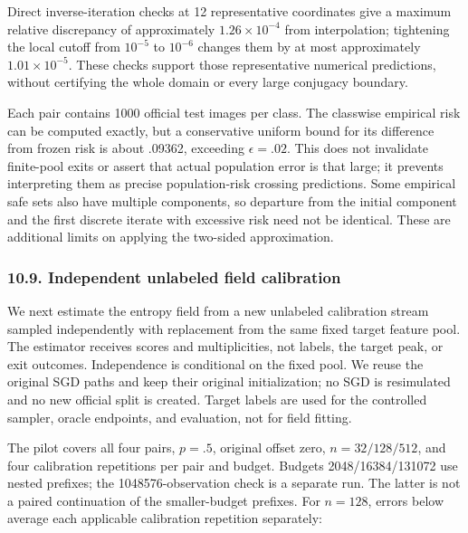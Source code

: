 Direct inverse-iteration checks at 12 representative coordinates give a
maximum relative discrepancy of approximately \(1.26\times10^{-4}\) from
interpolation; tightening the local cutoff from \(10^{-5}\) to
\(10^{-6}\) changes them by at most approximately \(1.01\times10^{-5}\).
These checks support those representative numerical predictions, without
certifying the whole domain or every large conjugacy boundary.

Each pair contains 1000 official test images per class. The classwise
empirical risk can be computed exactly, but a conservative uniform bound
for its difference from frozen risk is about .09362, exceeding
\(\epsilon=.02\). This does not invalidate finite-pool exits or assert
that actual population error is that large; it prevents interpreting
them as precise population-risk crossing predictions. Some empirical
safe sets also have multiple components, so departure from the initial
component and the first discrete iterate with excessive risk need not be
identical. These are additional limits on applying the two-sided
approximation.

\subsubsection{10.9. Independent unlabeled field
calibration}\label{experiments-independent-unlabeled-field-calibration}

We next estimate the entropy field from a new unlabeled calibration
stream sampled independently with replacement from the same fixed target
feature pool. The estimator receives scores and multiplicities, not
labels, the target peak, or exit outcomes. Independence is conditional
on the fixed pool. We reuse the original SGD paths and keep their
original initialization; no SGD is resimulated and no new official split
is created. Target labels are used for the controlled sampler, oracle
endpoints, and evaluation, not for field fitting.

The pilot covers all four pairs, \(p=.5\), original offset zero,
\(n=32/128/512\), and four calibration repetitions per pair and budget.
Budgets 2048/16384/131072 use nested prefixes; the 1048576-observation
check is a separate run. The latter is not a paired continuation of the
smaller-budget prefixes. For \(n=128\), errors below average each
applicable calibration repetition separately:


